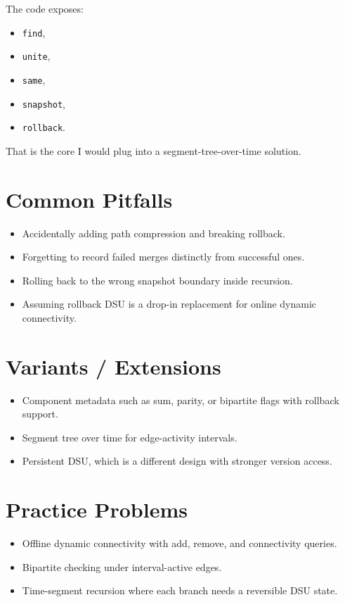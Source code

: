 The code exposes:

\begin{itemize}
  \item \texttt{find},
  \item \texttt{unite},
  \item \texttt{same},
  \item \texttt{snapshot},
  \item \texttt{rollback}.
\end{itemize}

That is the core I would plug into a segment-tree-over-time solution.

\section*{Common Pitfalls}

\begin{itemize}
  \item Accidentally adding path compression and breaking rollback.
  \item Forgetting to record failed merges distinctly from successful ones.
  \item Rolling back to the wrong snapshot boundary inside recursion.
  \item Assuming rollback DSU is a drop-in replacement for online dynamic connectivity.
\end{itemize}

\section*{Variants / Extensions}

\begin{itemize}
  \item Component metadata such as sum, parity, or bipartite flags with rollback support.
  \item Segment tree over time for edge-activity intervals.
  \item Persistent DSU, which is a different design with stronger version access.
\end{itemize}

\section*{Practice Problems}

\begin{itemize}
  \item Offline dynamic connectivity with add, remove, and connectivity queries.
  \item Bipartite checking under interval-active edges.
  \item Time-segment recursion where each branch needs a reversible DSU state.
\end{itemize}

